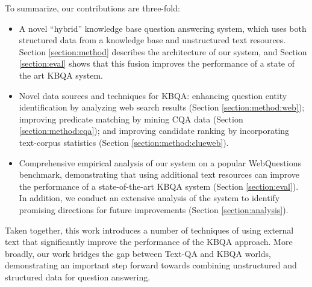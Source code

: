 To summarize, our contributions are three-fold:
\begin{itemize}
\item A novel ``hybrid'' knowledge base question answering system, which uses both structured data from a knowledge base and unstructured text resources. Section \ref{section:method} describes the architecture of our system, and Section \ref{section:eval} shows that this fusion improves the performance of a state of the art KBQA system.
\item Novel data sources and techniques for KBQA: enhancing question entity identification by analyzing web search results (Section \ref{section:method:web}); improving predicate matching by mining CQA data (Section \ref{section:method:cqa}); and improving candidate ranking by incorporating text-corpus statistics (Section \ref{section:method:clueweb}).
\item Comprehensive empirical analysis of our system on a popular WebQuestions benchmark, demonstrating that using additional text resources can improve the performance of a state-of-the-art KBQA system (Section \ref{section:eval}). In addition, we conduct an extensive analysis of the system to identify promising directions for future improvements (Section \ref{section:analysis}).
\end{itemize}

Taken together, this work introduces a number of techniques of using external text that significantly improve the performance of the KBQA approach.
More broadly, our work bridges the gap between Text-QA and KBQA worlds, demonstrating an important step forward towards combining unstructured and structured data for question answering.




